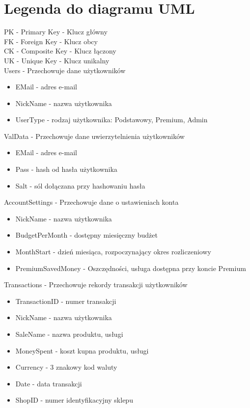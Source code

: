 \documentclass{article}
\begin{document}
    \section{Legenda do diagramu UML}
    PK - Primary Key - Klucz główny
    \\FK - Foreign Key - Klucz obcy
    \\CK - Composite Key - Klucz łączony
    \\UK - Unique Key - Klucz unikalny
    \\Users - Przechowuje dane użytkowników
    \begin{itemize}
    \item EMail - adres e-mail
    \item NickName - nazwa użytkownika
    \item UserType - rodzaj użytkownika: Podstawowy, Premium, Admin
    \end{itemize}
    ValData - Przechowuje dane uwierzytelnienia użytkowników
    \begin{itemize}
    \item EMail - adres e-mail
    \item Pass - hash od hasła użytkownika
    \item Salt - sól dołączana przy hashowaniu hasła
    \end{itemize}
    AccountSettings - Przechowuje dane o ustawieniach konta
    \begin{itemize}
    \item NickName - nazwa użytkownika
    \item BudgetPerMonth - dostępny miesięczny budżet
    \item MonthStart - dzień miesiąca, rozpoczynający okres rozliczeniowy
    \item PremiumSavedMoney - Oszczędności, usługa dostępna przy koncie Premium
    \end{itemize}
    Transactions - Przechowuje rekordy transakcji użytkowników
    \begin{itemize}
    \item TransactionID - numer transakcji
    \item NickName - nazwa użytkownika
    \item SaleName - nazwa produktu, usługi
    \item MoneySpent - koszt kupna produktu, usługi
    \item Currency - 3 znakowy kod waluty
    \item Date - data transakcji
    \item ShopID - numer identyfikacyjny sklepu
    \end{itemize}
\end{document}
